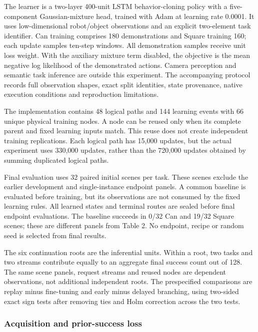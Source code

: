 \documentclass[10pt,letterpaper]{article}
\begin{document}
The learner is a two-layer 400-unit LSTM behavior-cloning policy with a
five-component Gaussian-mixture head, trained with Adam at learning rate
0.0001. It uses low-dimensional robot/object observations and an
explicit two-element task identifier. Can training comprises 180
demonstrations and Square training 160; each update samples ten-step
windows. All demonstration samples receive unit loss weight. With the
auxiliary mixture term disabled, the objective is the mean negative log
likelihood of the demonstrated actions. Camera perception and semantic
task inference are outside this experiment. The accompanying protocol
records full observation shapes, exact split identities, state
provenance, native execution conditions and reproduction limitations.

The implementation contains 48 logical paths and 144 learning events
with 66 unique physical training nodes. A node can be reused only when
its complete parent and fixed learning inputs match. This reuse does not
create independent training replications. Each logical path has 15,000
updates, but the actual experiment uses 330,000 updates, rather than the
720,000 updates obtained by summing duplicated logical paths.

Final evaluation uses 32 paired initial scenes per task. These scenes
exclude the earlier development and single-instance endpoint panels. A
common baseline is evaluated before training, but its observations are
not consumed by the fixed learning rules. All learned states and
terminal routes are sealed before final endpoint evaluations. The
baseline succeeds in 0/32 Can and 19/32 Square scenes; these are
different panels from Table 2. No endpoint, recipe or random seed is
selected from final results.

The six continuation roots are the inferential units. Within a root, two
tasks and two streams contribute equally to an aggregate final success
count out of 128. The same scene panels, request streams and reused
nodes are dependent observations, not additional independent roots. The
prespecified comparisons are replay minus fine-tuning and early minus
delayed branching, using two-sided exact sign tests after removing ties
and Holm correction across the two tests.

\subsubsection{Acquisition and prior-success
loss}\label{acquisition-and-prior-success-loss}
\end{document}
